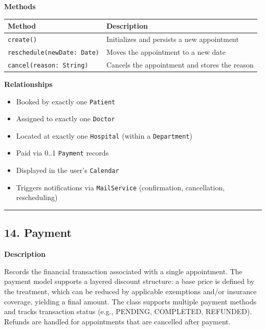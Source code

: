 \documentclass[12pt, a4paper]{article}
\begin{document}
\textbf{Methods}

\begin{center}
\small
\renewcommand{\arraystretch}{1.35}
\begin{tabularx}{\textwidth}{|M|Y|}
\hline
{}
\textbf{Method} & \textbf{Description} \\ \hline
\texttt{create()} & Initializes and persists a new appointment \\ \hline
\texttt{reschedule(newDate: Date)} & Moves the appointment to a new date \\ \hline
\texttt{cancel(reason: String)} & Cancels the appointment and stores the reason \\ \hline
\end{tabularx}
\end{center}

\textbf{Relationships}

\begin{itemize}
    \item Booked by exactly one \texttt{Patient}
    \item Assigned to exactly one \texttt{Doctor}
    \item Located at exactly one \texttt{Hospital} (within a \texttt{Department})
    \item Paid via 0..1 \texttt{Payment} records
    \item Displayed in the user's \texttt{Calendar}
    \item Triggers notifications via \texttt{MailService} (confirmation, cancellation, rescheduling)
\end{itemize}

\par\medskip\hrule\medskip

\subsection{14. Payment}\label{sec:14-payment}

\textbf{Description}

Records the financial transaction associated with a single appointment. The payment model supports a layered discount structure: a base price is defined by the treatment, which can be reduced by applicable exemptions and/or insurance coverage, yielding a final amount. The class supports multiple payment methods and tracks transaction status (e.g., PENDING, COMPLETED, REFUNDED). Refunds are handled for appointments that are cancelled after payment.
\end{document}
